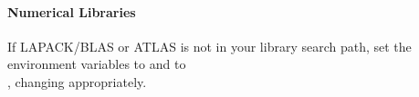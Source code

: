 
%

\paragraph{Numerical Libraries}
If LAPACK/BLAS or ATLAS is not in your library search path, set the environment variables  to  and  to\\ , changing  appropriately.

